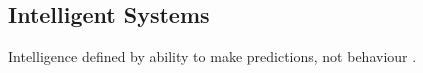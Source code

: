 \subsection{Intelligent Systems}

Intelligence defined by ability to make predictions, not behaviour \cite{intelligence_is_prediction}.

%
%

%
%

%
%
%
%
%
%
